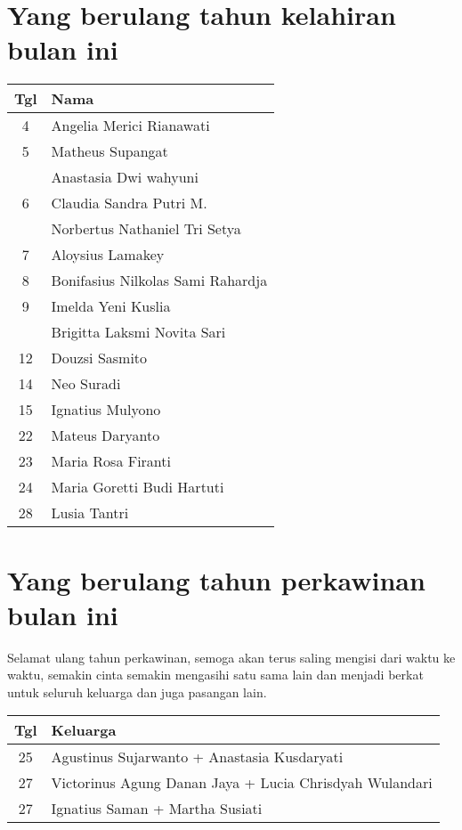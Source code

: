 

\section*{Yang berulang tahun kelahiran bulan ini}


\begin{longtable}{|c|l|} 
\hline Tgl & Nama \\ \hline
\endhead
4 & Angelia Merici Rianawati \\  
5 & Matheus Supangat \\  
 & Anastasia Dwi wahyuni \\  
6 & Claudia Sandra Putri M. \\  
 & Norbertus Nathaniel Tri Setya \\  
7 & Aloysius Lamakey \\  
8 & Bonifasius Nilkolas Sami Rahardja \\  
9 & Imelda Yeni Kuslia \\  
 & Brigitta Laksmi Novita Sari \\  
12 & Douzsi Sasmito \\  
14 & Neo Suradi \\  
15 & Ignatius Mulyono \\  
22 & Mateus Daryanto \\  
23 & Maria Rosa Firanti \\  
24 & Maria Goretti Budi Hartuti \\  
28 & Lusia Tantri \\ \hline 
\end{longtable}
 
\section*{Yang berulang tahun perkawinan  bulan ini}

Selamat ulang tahun perkawinan, semoga akan terus saling mengisi dari waktu ke waktu, semakin cinta semakin mengasihi satu sama lain dan menjadi berkat untuk seluruh keluarga dan juga pasangan lain.

\begin{longtable}{|c|l|} 
\hline Tgl & Keluarga \\ \hline
25 & Agustinus Sujarwanto + Anastasia Kusdaryati \\
27 & Victorinus Agung Danan Jaya + Lucia Chrisdyah Wulandari \\ 
27 & Ignatius Saman + Martha Susiati \\ \hline 
\end{longtable}

